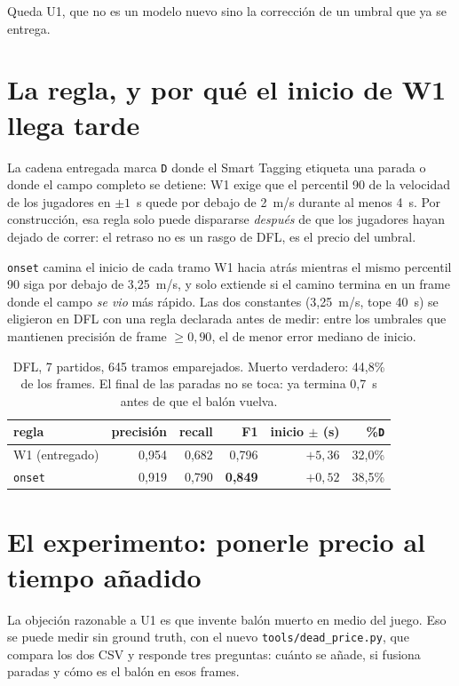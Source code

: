 \documentclass[11pt,a4paper]{article}
\newcommand{\code}[1]{\texttt{\small #1}}
\begin{document}
Queda U1, que no es un modelo nuevo sino la corrección de un umbral que ya se entrega.

\section{La regla, y por qué el inicio de W1 llega tarde}

La cadena entregada marca \code{D} donde el Smart Tagging etiqueta una parada o donde el campo
completo se detiene: W1 exige que el percentil 90 de la velocidad de los jugadores en $\pm 1$~s
quede por debajo de 2~m/s durante al menos 4~s. Por construcción, esa regla solo puede dispararse
\emph{después} de que los jugadores hayan dejado de correr: el retraso no es un rasgo de DFL, es el
precio del umbral.

\texttt{onset} camina el inicio de cada tramo W1 hacia atrás mientras el mismo percentil 90 siga por
debajo de 3,25~m/s, y solo extiende si el camino termina en un frame donde el campo \emph{se vio} más
rápido. Las dos constantes (3,25~m/s, tope 40~s) se eligieron en DFL con una regla declarada antes de
medir: entre los umbrales que mantienen precisión de frame $\geq 0{,}90$, el de menor error mediano
de inicio.

\begin{table}[h]
\centering
\small
\begin{tabular}{lrrrrr}
\toprule
regla & precisión & recall & F1 & inicio $\pm$ (s) & \%\code{D} \\
\midrule
W1 (entregado) & 0,954 & 0,682 & 0,796 & $+5{,}36$ & 32,0\% \\
\texttt{onset} & 0,919 & 0,790 & \textbf{0,849} & $+0{,}52$ & 38,5\% \\
\bottomrule
\end{tabular}
\caption{DFL, 7 partidos, 645 tramos emparejados. Muerto verdadero: 44,8\% de los frames. El final de
las paradas no se toca: ya termina 0,7~s antes de que el balón vuelva.}
\end{table}

\section{El experimento: ponerle precio al tiempo añadido}

La objeción razonable a U1 es que invente balón muerto en medio del juego. Eso se puede medir sin
ground truth, con el nuevo \code{tools/dead\_price.py}, que compara los dos CSV y responde tres
preguntas: cuánto se añade, si fusiona paradas y cómo es el balón en esos frames.
\end{document}
